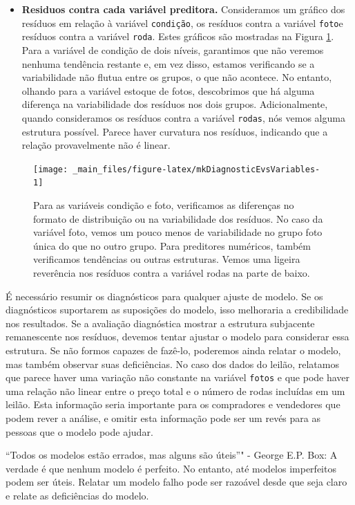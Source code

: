 \documentclass[
]{book}
\providecommand{\tightlist}{%
  \setlength{\itemsep}{0pt}\setlength{\parskip}{0pt}}
\theoremstyle{definition}
\theoremstyle{definition}
\theoremstyle{definition}
\theoremstyle{definition}
\theoremstyle{remark}
\begin{document}
\begin{itemize}
\tightlist
\item
  \textbf{Residuos contra cada variável preditora.} Consideramos um gráfico dos resíduos em relação à variável \texttt{condição}, os resíduos contra a variável \texttt{foto}e resíduos contra a variável \texttt{roda}. Estes gráficos são mostradas na Figura \ref{fig:mkDiagnosticEvsVariables}. Para a variável de condição de dois níveis, garantimos que não veremos nenhuma tendência restante e, em vez disso, estamos verificando se a variabilidade não flutua entre os grupos, o que não acontece. No entanto, olhando para a variável estoque de fotos, descobrimos que há alguma diferença na variabilidade dos resíduos nos dois grupos. Adicionalmente, quando consideramos os resíduos contra a variável \texttt{rodas}, nós vemos alguma estrutura possível. Parece haver curvatura nos resíduos, indicando que a relação provavelmente não é linear.
\end{itemize}

\begin{figure}
\texttt{[image: \_main\_files/figure-latex/mkDiagnosticEvsVariables-1]} \caption{Para as variáveis condição e foto, verificamos as diferenças no formato de distribuição ou na variabilidade dos resíduos. No caso da variável foto, vemos um pouco menos de variabilidade no grupo foto única do que no outro grupo. Para preditores numéricos, também verificamos tendências ou outras estruturas. Vemos uma ligeira reverência nos resíduos contra a variável rodas na parte de baixo.}\label{fig:mkDiagnosticEvsVariables}
\end{figure}

É necessário resumir os diagnósticos para qualquer ajuste de modelo. Se os diagnósticos suportarem as suposições do modelo, isso melhoraria a credibilidade nos resultados. Se a avaliação diagnóstica mostrar a estrutura subjacente remanescente nos resíduos, devemos tentar ajustar o modelo para considerar essa estrutura. Se não formos capazes de fazê-lo, poderemos ainda relatar o modelo, mas também observar suas deficiências. No caso dos dados do leilão, relatamos que parece haver uma variação não constante na variável \texttt{fotos} e que pode haver uma relação não linear entre o preço total e o número de rodas incluídas em um leilão. Esta informação seria importante para os compradores e vendedores que podem rever a análise, e omitir esta informação pode ser um revés para as pessoas que o modelo pode ajudar.

``Todos os modelos estão errados, mas alguns são úteis''" - George E.P. Box: A verdade é que nenhum modelo é perfeito. No entanto, até modelos imperfeitos podem ser úteis. Relatar um modelo falho pode ser razoável desde que seja claro e relate as deficiências do modelo.
\end{document}
